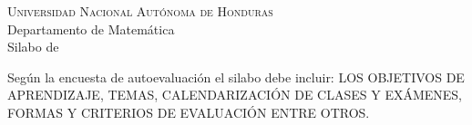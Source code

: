 \documentclass[letterpaper]{article}
\begin{document}
\begin{center}
  \Large \textsc{Universidad Nacional Autónoma de Honduras}\\
  \large Departamento de Matemática\\
  Silabo de %
\end{center}
Según la encuesta de autoevaluación el silabo debe incluir:
LOS OBJETIVOS DE APRENDIZAJE, TEMAS, CALENDARIZACIÓN DE CLASES Y EXÁMENES, FORMAS Y CRITERIOS DE EVALUACIÓN ENTRE OTROS.

\end{document}
